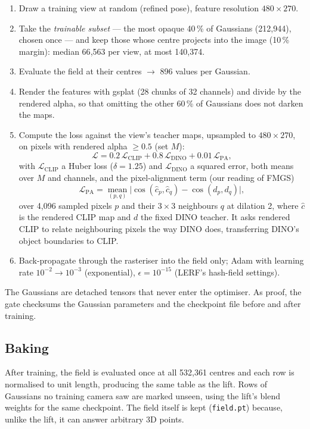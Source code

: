 \documentclass[11pt,a4paper]{article}
\newcommand{\code}[1]{\texttt{#1}}
\begin{document}
\begin{enumerate}
  \item Draw a training view at random (refined pose), feature resolution $480\times270$.
  \item Take the \emph{trainable subset} --- the most opaque 40\,\% of Gaussians (212{,}944), chosen once --- and
        keep those whose centre projects into the image (10\,\% margin): median 66{,}563 per view, at most
        140{,}374.
  \item Evaluate the field at their centres $\rightarrow$ 896 values per Gaussian.
  \item Render the features with gsplat (28 chunks of 32 channels) and divide by the rendered alpha, so that
        omitting the other 60\,\% of Gaussians does not darken the maps.
  \item Compute the loss against the view's teacher maps, upsampled to $480\times270$, on pixels with rendered
        alpha $\geq 0.5$ (set $M$):
  \begin{equation}
    \mathcal{L} = 0.2\,\mathcal{L}_{\mathrm{CLIP}} + 0.8\,\mathcal{L}_{\mathrm{DINO}} + 0.01\,\mathcal{L}_{\mathrm{PA}},
  \end{equation}
  with $\mathcal{L}_{\mathrm{CLIP}}$ a Huber loss ($\delta=1.25$) and $\mathcal{L}_{\mathrm{DINO}}$ a squared
  error, both means over $M$ and channels, and the pixel-alignment term (our reading of FMGS)
  \begin{equation}
    \mathcal{L}_{\mathrm{PA}} = \operatorname*{mean}_{(p,q)} \bigl|\cos(\hat c_p, \hat c_q) - \cos(d_p, d_q)\bigr| ,
  \end{equation}
  over 4{,}096 sampled pixels $p$ and their $3\times3$ neighbours $q$ at dilation 2, where $\hat c$ is the rendered
  CLIP map and $d$ the fixed DINO teacher. It asks rendered CLIP to relate neighbouring pixels the way DINO does,
  transferring DINO's object boundaries to CLIP.
  \item Back-propagate through the rasteriser into the field only; Adam with learning rate $10^{-2}\rightarrow10^{-3}$
        (exponential), $\epsilon = 10^{-15}$ (LERF's hash-field settings).
\end{enumerate}
The Gaussians are detached tensors that never enter the optimiser. As proof, the gate checksums the Gaussian
parameters and the checkpoint file before and after training.

\subsection{Baking}
After training, the field is evaluated once at all 532{,}361 centres and each row is normalised to unit length,
producing the same table as the lift. Rows of Gaussians no training camera saw are marked unseen, using the lift's
blend weights for the same checkpoint. The field itself is kept (\code{field.pt}) because, unlike the lift, it can
answer arbitrary 3D points.
\end{document}

